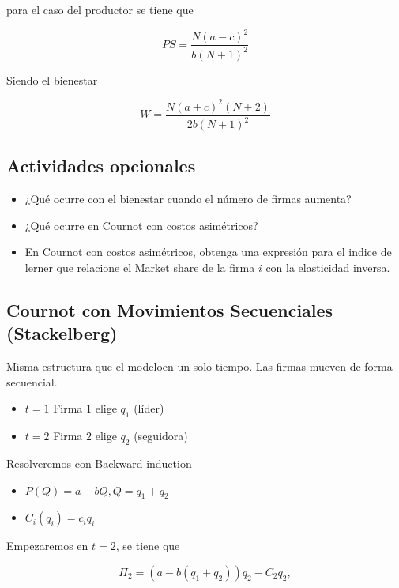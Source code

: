 \documentclass[letterpaper,12pt,twocolumn]{report}
\begin{document}
para el caso del productor se tiene que 

$$  PS= \frac{N(a-c)^2}{b(N+1)^2}  $$

Siendo el bienestar 

$$ W= \frac{N(a+c)^2(N+2)}{2b(N+1)^2} $$

\subsection*{Actividades opcionales}

\begin{itemize}
	\item ¿Qué ocurre con el bienestar cuando el número de firmas aumenta?
	\item ¿Qué ocurre en Cournot con costos asimétricos?
	\item En Cournot con costos asimétricos, obtenga una expresión para el indice de lerner que relacione el Market share de la firma $i$ con la elasticidad inversa.
	
\end{itemize}

	\subsection*{Cournot con Movimientos Secuenciales (Stackelberg)}

Misma estructura que el modeloen un solo tiempo. Las firmas mueven de forma secuencial.

\begin{tcolorbox}[title= Tiempos]
	\begin{itemize}
		\item $t=1$ Firma $1$ elige $q_1$ (líder)
		\item $t=2$ Firma $2$ elige $q_2$ (seguidora)
	\end{itemize}
\end{tcolorbox}

Resolveremos con Backward induction

\begin{tcolorbox}[title=Información necesaria]
	\begin{itemize}
		\item $ P(Q) = a-bQ, Q=q_1+q_2$
		\item $C_i(q_i)= c_iq_i$
	\end{itemize}
\end{tcolorbox}

Empezaremos en $t=2$, se tiene que 

$$ \Pi_2 = (a-b(q_1+q_2))q_2-C_2q_2, $$
\end{document}
